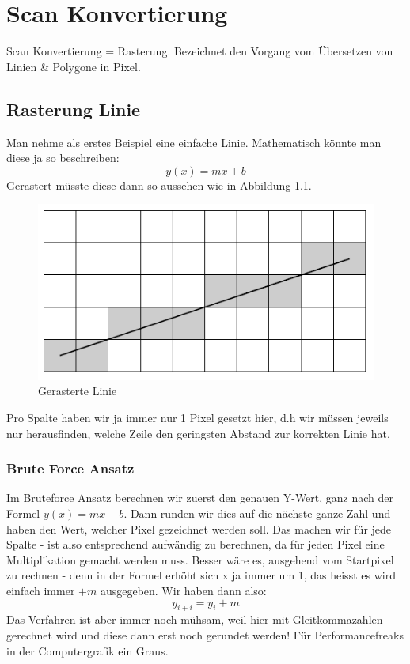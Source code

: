 \chapter{Scan Konvertierung}
Scan Konvertierung = Rasterung. Bezeichnet den Vorgang vom Übersetzen von Linien \& Polygone in Pixel.
\section{Rasterung Linie}
Man nehme als erstes Beispiel eine einfache Linie. Mathematisch könnte man diese ja so beschreiben:
\begin{displaymath}
y(x)=mx+b
\end{displaymath}
Gerastert müsste diese dann so aussehen wie in Abbildung \ref{fig:gerasterte_linie}.
\begin{figure}[!ht]
	\centering
	\includegraphics[width=0.4\linewidth]{fig/gerasterte_linie}
	\caption{Gerasterte Linie}
	\label{fig:gerasterte_linie}
\end{figure}
Pro Spalte haben wir ja immer nur 1 Pixel gesetzt hier, d.h wir müssen jeweils nur herausfinden, welche Zeile den geringsten Abstand zur korrekten Linie hat.



\subsection{Brute Force Ansatz}
Im Bruteforce Ansatz berechnen wir zuerst den genauen Y-Wert, ganz nach der Formel \(y(x)=mx+b\). Dann runden wir dies auf die nächste ganze Zahl und haben den Wert, welcher Pixel gezeichnet werden soll. Das machen wir für jede Spalte - ist also entsprechend aufwändig zu berechnen, da für jeden Pixel eine Multiplikation gemacht werden muss. Besser wäre es, ausgehend vom Startpixel zu rechnen - denn in der Formel erhöht sich x ja immer um 1, das heisst es wird einfach immer \(+ m\) ausgegeben. Wir haben dann also:
\begin{displaymath}
y_{i+i}=y_i+m
\end{displaymath}
Das Verfahren ist aber immer noch mühsam, weil hier mit Gleitkommazahlen gerechnet wird und diese dann erst noch gerundet werden! Für Performancefreaks in der Computergrafik ein Graus.

